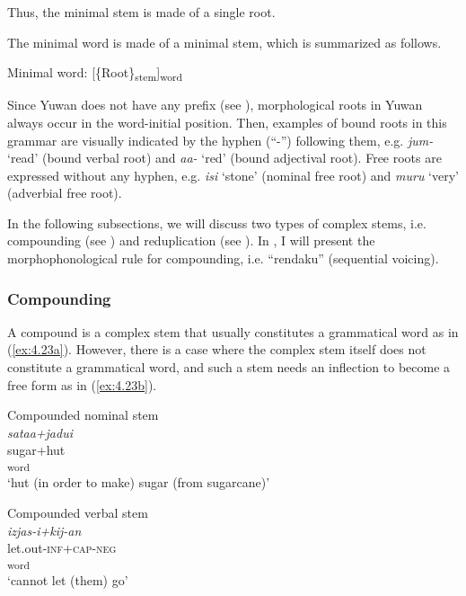 Thus, the minimal stem is made of a single root.

The minimal word is made of a minimal stem, which is summarized as follows.

\ea  Minimal word: [\{Root\}\textsubscript{stem}]\textsubscript{word} \label{ex:4.22}\z

Since Yuwan does not have any prefix (see ), morphological roots in Yuwan always occur in the word-initial position. Then, examples of bound roots in this grammar are visually indicated by the hyphen (“-”) following them, e.g. \textit{jum-} ‘read’ (bound verbal root) and \textit{aa-} ‘red’ (bound adjectival root). Free roots are expressed without any hyphen, e.g. \textit{isi} ‘stone’ (nominal free root) and \textit{muru} ‘very’ (adverbial free root).

In the following subsections, we will discuss two types of complex stems, i.e. compounding (see ) and reduplication (see ). In , I will present the morphophonological rule for compounding, i.e. “rendaku” (sequential voicing).

\subsubsection{Compounding}\label{sec:4.2.3.1}

A compound is a complex stem that usually constitutes a grammatical word as in (\ref{ex:4.23a}). However, there is a case where the complex stem itself does not constitute a grammatical word, and such a stem needs an inflection to become a free form as in (\ref{ex:4.23b}).

\ea \label{ex:4.23}
\ea Compounded nominal stem \label{ex:4.23a}\\
 \glll \textit{sataa+jadui}\\
    sugar+hut\\
    [\{Stem\textsubscript{1}+Stem\textsubscript{2}\}\textsubscript{compound}]\textsubscript{word}\\
    \glt ‘hut (in order to make) sugar (from sugarcane)’
    
\ex Compounded verbal stem \label{ex:4.23b}\\
\glll \textit{izjas-i+kij-an}\\
    let.out-\textsc{inf}+\textsc{cap}-\textsc{neg}\\
    [\{Stem\textsubscript{1}+Stem\textsubscript{2}\}\textsubscript{compound}{}-Affix]\textsubscript{word}\\
\glt    ‘cannot let (them) go’
\z
\z

